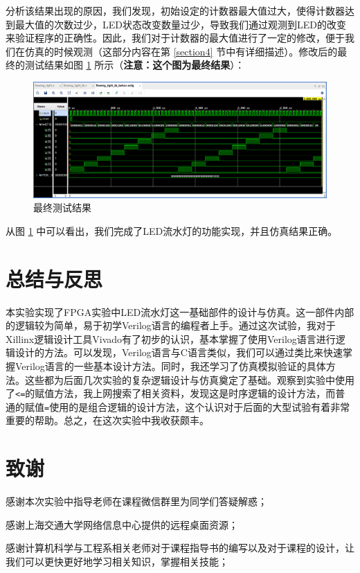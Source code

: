 \documentclass{cumcm}
\numberwithin{equation}{section}
\numberwithin{equation}{subsection}
\begin{document}
分析该结果出现的原因，我们发现，初始设定的计数器最大值过大，使得计数器达到最大值的次数过少，LED状态改变数量过少，导致我们通过观测到LED的改变来验证程序的正确性。因此，我们对于计数器的最大值进行了一定的修改，便于我们在仿真的时候观测（这部分内容在第 \ref{section4} 节中有详细描述）。修改后的最终的测试结果如图 \ref{fig2} 所示（\textbf{注意：这个图为最终结果}）：

\begin{figure}[htbp]
    \centering
    \includegraphics[width=6.3in]{2.png}
    \caption{最终测试结果}
    \label{fig2}
\end{figure}

从图 \ref{fig2} 中可以看出，我们完成了LED流水灯的功能实现，并且仿真结果正确。

\section{总结与反思}\label{section5}

本实验实现了FPGA实验中LED流水灯这一基础部件的设计与仿真。这一部件内部的逻辑较为简单，易于初学Verilog语言的编程者上手。通过这次试验，我对于Xillinx逻辑设计工具Vivado有了初步的认识，基本掌握了使用Verilog语言进行逻辑设计的方法。可以发现，Verilog语言与C语言类似，我们可以通过类比来快速掌握Verilog语言的一些基本设计方法。同时，我还学习了仿真模拟验证的具体方法。这些都为后面几次实验的复杂逻辑设计与仿真奠定了基础。观察到实验中使用了\texttt{<=}的赋值方法，我上网搜索了相关资料，发现这是时序逻辑的设计方法，而普通的赋值\texttt{=}使用的是组合逻辑的设计方法，这个认识对于后面的大型试验有着非常重要的帮助。总之，在这次实验中我收获颇丰。

\section{致谢}\label{section6}
感谢本次实验中指导老师在课程微信群里为同学们答疑解惑；

感谢上海交通大学网络信息中心提供的远程桌面资源；

感谢计算机科学与工程系相关老师对于课程指导书的编写以及对于课程的设计，让我们可以更快更好地学习相关知识，掌握相关技能；
\end{document}
